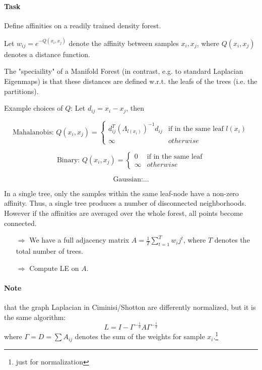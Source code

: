\paragraph{Task} Define affinities on a readily trained density forest.

Let \(w_{ij} = e^{-Q(x_i, x_j)}\) denote the affinity between samples \(x_i,x_j\), where \(Q(x_i, x_j)\) denotes a distance function.

The "speciaility" of a Manifold Forest (in contrast, e.g. to standard Laplacian Eigenmaps) is that these distances are defined w.r.t. the leafs of the trees (i.e. the partitions).

\bigbreak

Example choices of \(Q\): Let \(d_{ij} = x_i - x_j\), then

\[\text{Mahalanobis: } Q(x_i, x_j) = \begin{cases} d_{ij}^T(\Lambda_{l(x_i)})^{-1} d_{ij} & \text{if in the same leaf } l(x_i) \\ \infty & otherwise \end{cases}\]

\[\text{Binary: } Q(x_i, x_j) = \begin{cases} 0 & \text{if in the same leaf} \\ \infty & otherwise \end{cases}\]

\[\text{Gaussian:} ...\]

In a single tree, only the samples within the same leaf-node have a non-zero affinity. Thus, a single tree produces a number of disconnected neighborhoods.
However if the affinities are averaged over the whole forest, all points become connected.

\begin{itemize}
  \item[\(\Rightarrow\)] We have a full adjacency matrix \(A = \frac{1}{T} \sum_{t=1}^T w_ij^t\), where \(T\) denotes the total number of trees.
  \item[\(\Rightarrow\)] Compute LE on \(A\).
\end{itemize}

\paragraph{Note} that the graph Laplacian in Ciminisi/Shotton  are differently normalized, but it is the same algorithm:
\[L = I - \Gamma^{-\frac{1}{2}} A \Gamma^{-\frac{1}{2}}\]
where \(\Gamma = D = \sum A_{ij}\) denotes the sum of the weights for sample \(x_i\).\footnote{just for normalization}

